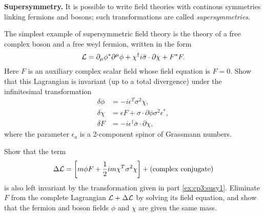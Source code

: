 \problem \textbf{Supersymmetry.} It is possible to write field theories with continous symmetries linking fermions and bosons; such 
transformations are called \textit{supersymmetries}.
\begin{problembody}
    \item\label{ex:cp3:susy1} The simplest example of supersymmetric field theory is the theory of a free complex boson and a free weyl fermion, written in the form
    \begin{equation}\label{equ:cp3:susy_lag}
        \mathcal{L} = \partial_\mu\phi^\ast\partial^\mu\phi 
            + \chi^\dagger i\bar{\sigma}\cdot\partial\chi
            + F^\ast F.
    \end{equation}
    Here $F$ is an auxiliary complex scalar field whose field equation is $F = 0$. Show that this Lagrangian is invariant (up to a total divergence)
    under the infinitesimal transformation
    \begin{subequations}\label{equ:cp3:susy_sym_trans}
        \begin{align}
            \delta\phi & = -i\epsilon^T\sigma^2\chi,\\
            \delta\chi & = \epsilon F + \sigma\cdot\partial\phi \sigma^2\epsilon^\ast,\\
            \delta F & = -i\epsilon^\dagger\bar{\sigma}\cdot\partial\chi,
        \end{align}
    \end{subequations}
    where the parameter $\epsilon_a$ is a 2-component spinor of Grassmann numbers.

    \item Show that the term
    \begin{equation}\label{equ:cp3:susy_mass_terms}
        \Delta\mathcal{L} = \left[m\phi F + \frac{1}{2}im\chi^T\sigma^2\chi\right] + (\text{complex conjugate})
    \end{equation}
    is also left invariant by the transformation given in part \ref{ex:cp3:susy1}. Eliminate $F$ from the complete Lagrangian $\mathcal{L} + \Delta\mathcal{L}$ by solving its field
    equation, and show that the fermion and boson fields $\phi$ and $\chi$ are given the same mass.


\end{problembody}
